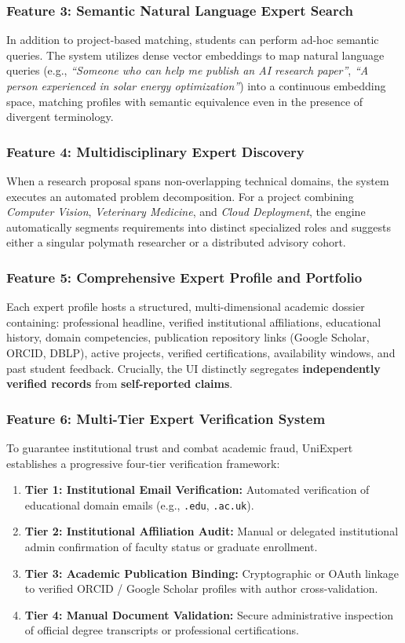 \documentclass[11pt,a4paper]{article}
\begin{document}
\subsubsection{Feature 3: Semantic Natural Language Expert Search}
In addition to project-based matching, students can perform ad-hoc semantic queries. The system utilizes dense vector embeddings to map natural language queries (e.g., \textit{``Someone who can help me publish an AI research paper''}, \textit{``A person experienced in solar energy optimization''}) into a continuous embedding space, matching profiles with semantic equivalence even in the presence of divergent terminology.

\subsubsection{Feature 4: Multidisciplinary Expert Discovery}
When a research proposal spans non-overlapping technical domains, the system executes an automated problem decomposition. For a project combining \textit{Computer Vision}, \textit{Veterinary Medicine}, and \textit{Cloud Deployment}, the engine automatically segments requirements into distinct specialized roles and suggests either a singular polymath researcher or a distributed advisory cohort.

\subsubsection{Feature 5: Comprehensive Expert Profile and Portfolio}
Each expert profile hosts a structured, multi-dimensional academic dossier containing: professional headline, verified institutional affiliations, educational history, domain competencies, publication repository links (Google Scholar, ORCID, DBLP), active projects, verified certifications, availability windows, and past student feedback. Crucially, the UI distinctly segregates \textbf{independently verified records} from \textbf{self-reported claims}.

\subsubsection{Feature 6: Multi-Tier Expert Verification System}
To guarantee institutional trust and combat academic fraud, UniExpert establishes a progressive four-tier verification framework:
\begin{enumerate}
    \item \textbf{Tier 1: Institutional Email Verification:} Automated verification of educational domain emails (e.g., \texttt{.edu}, \texttt{.ac.uk}).
    \item \textbf{Tier 2: Institutional Affiliation Audit:} Manual or delegated institutional admin confirmation of faculty status or graduate enrollment.
    \item \textbf{Tier 3: Academic Publication Binding:} Cryptographic or OAuth linkage to verified ORCID / Google Scholar profiles with author cross-validation.
    \item \textbf{Tier 4: Manual Document Validation:} Secure administrative inspection of official degree transcripts or professional certifications.
\end{enumerate}
\end{document}
